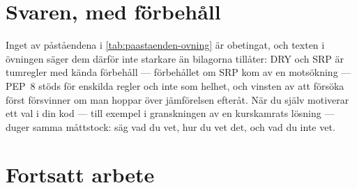 \section{Svaren, med förbehåll}
\label{sec:tut-var-slutsats}

Inget av påståendena i \cref{tab:paastaenden-ovning} är obetingat, och
texten i övningen säger dem därför inte starkare än bilagorna tillåter:
DRY och SRP är tumregler med kända förbehåll --- förbehållet om SRP kom
av en motsökning --- PEP~8 stöds för enskilda regler och inte som
helhet, och vinsten av att försöka först försvinner om man hoppar över
jämförelsen efteråt.  När du själv motiverar ett val i din kod --- till
exempel i granskningen av en kurskamrats lösning --- duger samma
måttstock: säg vad du vet, hur du vet det, och vad du inte vet.

\section{Fortsatt arbete}
\label{sec:tut-var-fortsatt}

